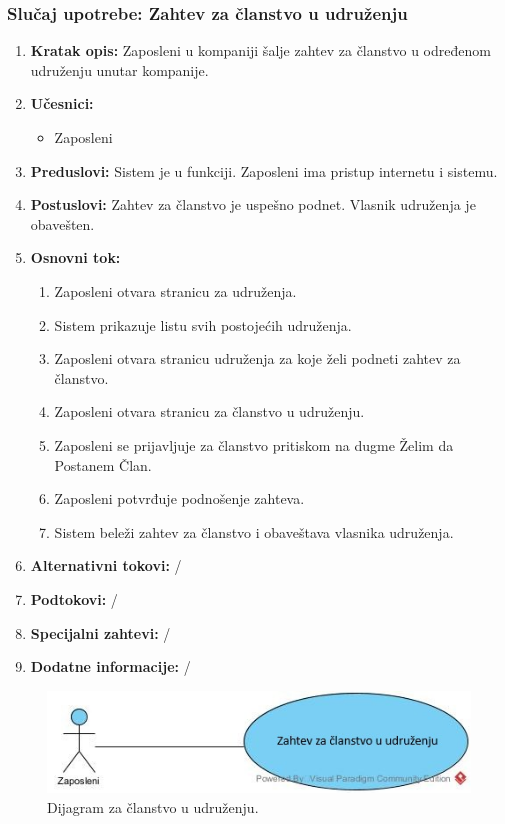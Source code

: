 \documentclass[a4paper]{article}
\begin{document}
\subsubsection{Slučaj upotrebe: Zahtev za članstvo u udruženju}
\begin{enumerate}
    \item \textbf{Kratak opis:} Zaposleni u kompaniji šalje zahtev za članstvo u određenom udruženju unutar kompanije.
    \item \textbf{Učesnici:}
        \begin{itemize}
            \item Zaposleni
        \end{itemize}
    \item \textbf{Preduslovi:} Sistem je u funkciji. Zaposleni ima pristup internetu i sistemu.
    \item \textbf{Postuslovi:} Zahtev za članstvo je uspešno podnet. Vlasnik udruženja je obavešten.
    \item \textbf{Osnovni tok:}
        \begin{enumerate}
            \item Zaposleni otvara stranicu za udruženja.
            \item Sistem prikazuje listu svih postojećih udruženja.
            \item Zaposleni otvara stranicu udruženja za koje želi podneti zahtev za članstvo.
            \item Zaposleni otvara stranicu za članstvo u udruženju.
            \item Zaposleni se prijavljuje za članstvo pritiskom na dugme Želim da Postanem Član.
            \item Zaposleni potvrđuje podnošenje zahteva.
            \item Sistem beleži zahtev za članstvo i obaveštava vlasnika udruženja.
        \end{enumerate}
    \item \textbf{Alternativni tokovi:} /
    \item \textbf{Podtokovi:} /
    \item \textbf{Specijalni zahtevi:} /
    \item \textbf{Dodatne informacije:} /
\end{enumerate}

\begin{figure} [!ht]
    \begin{center}
        \includegraphics[scale=0.5]{Korisnici/Udruzenje/UML/SlucajUpotrebe_Clanstvo.jpg}
    \end{center}
\caption{Dijagram za članstvo u udruženju.}
\end{figure}
\end{document}
